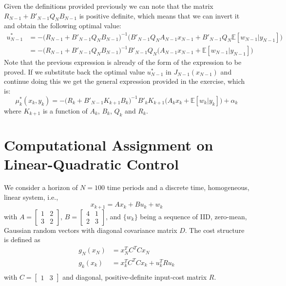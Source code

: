 \documentclass[11pt, oneside]{article}   	%
\begin{document}
Given the definitions provided previously we can note that the matrix $R_{N-1} + B'_{N-1}Q_{N}B_{N-1}$ is positive definite, which means that we can invert it and obtain the following optimal value:
\begin{align*}
u_{N-1}^{*} &= - \big(R_{N-1} + B'_{N-1}Q_{N}B_{N-1}\big)^{-1}\big(B'_{N-1}Q_{N}A_{N-1}x_{N-1} + B'_{N-1}Q_{N} \mathbb{E}[w_{N-1}|y_{N-1}]\big)\\
&= - \big(R_{N-1} + B'_{N-1}Q_{N}B_{N-1}\big)^{-1}B'_{N-1}Q_{N}\big(A_{N-1}x_{N-1} +\mathbb{E}[w_{N-1}|y_{N-1}]\big)
\end{align*}
Note that the previous expression is already of the form of the expression to be proved. If we substitute back the optimal value $u_{N-1}^{*}$ in $J_{N-1}(x_{N-1})$ and continue doing this we get the general expression provided in the exercise, which is:
$$\mu_{k}^{*}(x_{k},y_{k}) = - \big(R_{k} + B'_{N-1}K_{k+1}B_{k}\big)^{-1}B'_{k}K_{k+1}\big(A_{k}x_{k} + \mathbb{E}[w_{k}|y_{k}]\big) + \alpha_{k}$$
where $K_{k+1}$ is a function of $A_{k}$, $B_{k}$, $Q_{k}$ and $R_{k}$.

\newpage
\section{Computational Assignment on Linear-Quadratic Control}
We consider a horizon of $N=100$ time periods and a discrete time, homogeneous, linear system, i.e.,
$$ x_{k+1} = A x_k + B u_k + w_k$$
with $A = \begin{bmatrix} 1 & 2 \\[0.3em] 3 & 2 \end{bmatrix}$,
       $B = \begin{bmatrix} 4 & 1 \\[0.3em] 2 & 3 \end{bmatrix}$,
and $\{w_k\}$ being a sequence of IID, zero-mean, Gaussian random vectors with diagonal covariance matrix $D$.
The cost structure is defined as
\begin{align*}
g_{N}(x_{N}) &= x_N^T C^T C x_N\\
g_{k}(x_{k}) &= x_k^T C^T C x_k + u_k^T R u_k\\
\end{align*}
with $C = \begin{bmatrix} 1 & 3 \end{bmatrix}$ and diagonal, positive-definite input-cost matrix $R$.
\end{document}
